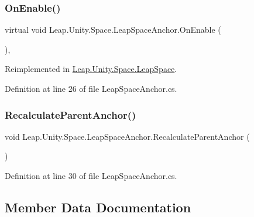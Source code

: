 \subsubsection{\texorpdfstring{OnEnable()}{OnEnable()}}
{\footnotesize\ttfamily virtual void Leap.\+Unity.\+Space.\+Leap\+Space\+Anchor.\+On\+Enable (\begin{DoxyParamCaption}{ }\end{DoxyParamCaption})\hspace{0.3cm}{\ttfamily [protected]}, {\ttfamily [virtual]}}



Reimplemented in \mbox{\hyperlink{class_leap_1_1_unity_1_1_space_1_1_leap_space_ad15999d46ce8be0203f2a5b67ced8a8e}{Leap.\+Unity.\+Space.\+Leap\+Space}}.



Definition at line 26 of file Leap\+Space\+Anchor.\+cs.

\mbox{\label{class_leap_1_1_unity_1_1_space_1_1_leap_space_anchor_a1af147f4c4a59aec2552652d7eb6a0f1}} 
\subsubsection{\texorpdfstring{RecalculateParentAnchor()}{RecalculateParentAnchor()}}
{\footnotesize\ttfamily void Leap.\+Unity.\+Space.\+Leap\+Space\+Anchor.\+Recalculate\+Parent\+Anchor (\begin{DoxyParamCaption}{ }\end{DoxyParamCaption})}



Definition at line 30 of file Leap\+Space\+Anchor.\+cs.



\subsection{Member Data Documentation}
\mbox{\label{class_leap_1_1_unity_1_1_space_1_1_leap_space_anchor_a8df76f5c9ba6a0f169880fec6bca557b}} 

